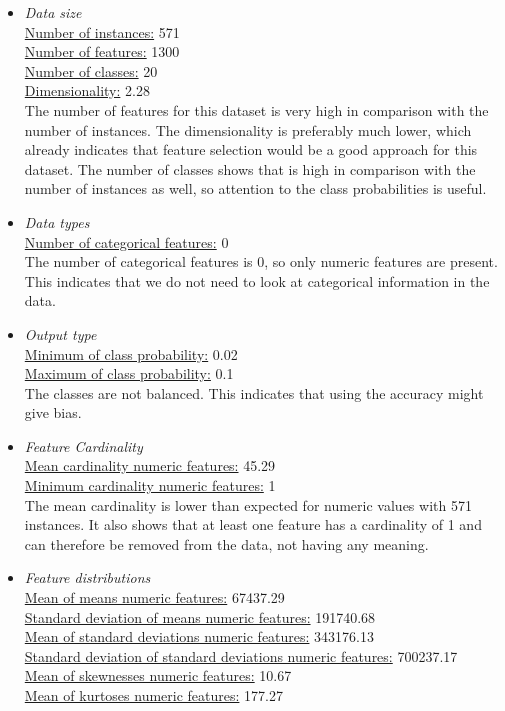 \documentclass[10pt,a4paper]{report}
\begin{document}
	\begin{itemize}
		\item \textit{Data size} \\
		\underline{Number of instances:} 571 \\
		\underline{Number of features:} 1300 \\
		\underline{Number of classes:} 20 \\
		\underline{Dimensionality:} 2.28 \\
		
		The number of features for this dataset is very high in comparison with the number of instances. The dimensionality is preferably much lower, which already indicates that feature selection would be a good approach for this dataset. The number of classes shows that is high in comparison with the number of instances as well, so attention to the class probabilities is useful.
		
		\item \textit{Data types} \\
		\underline{Number of categorical features:} 0 \\
		
		The number of categorical features is 0, so only numeric features are present. This indicates that we do not need to look at categorical information in the data.
		
		\item \textit{Output type} \\
		\underline{Minimum of class probability:} 0.02 \\
		\underline{Maximum of class probability:} 0.1 \\
		
		The classes are not balanced. This indicates that using the accuracy might give bias.
		
		\item \textit{Feature Cardinality} \\
		\underline{Mean cardinality numeric features:} 45.29 \\
		\underline{Minimum cardinality numeric features:} 1 \\
		
		The mean cardinality is lower than expected for numeric values with 571 instances. It also shows that at least one feature has a cardinality of 1 and can therefore be removed from the data, not having any meaning.
		
		\item \textit{Feature distributions} \\
		\underline{Mean of means numeric features:} 67437.29 \\
		\underline{Standard deviation of means numeric features:} 191740.68 \\
		\underline{Mean of standard deviations numeric features:} 343176.13 \\
		\underline{Standard deviation of standard deviations numeric features:} 700237.17 \\
		\underline{Mean of skewnesses numeric features:} 10.67 \\
		\underline{Mean of kurtoses numeric features:} 177.27 \\
		

\end{itemize}
\end{document}

